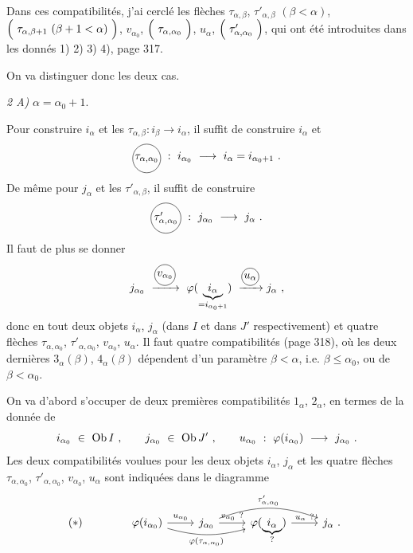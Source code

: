 Dans ces compatibilités, j'ai cerclé les flèches $\tau_{\alpha,\beta}$, $\tau'_{\alpha,\beta}$ $(\beta<\alpha)$, $\Bigl(\ \tau_{\alpha,\beta+1}\ (\beta+1<\alpha)\ \Bigr)$, $v_{\alpha_0}$, $\Bigl(\ \tau_{\alpha,\alpha_0}\ \Bigr)$, $u_\alpha$, $\Bigl(\ \tau'_{\alpha,\alpha_0}\ \Bigr)$, qui ont été introduites dans les donnés 1) 2) 3) 4), page 317. %


On va distinguer donc les deux cas.

\textit{2 A)} $\alpha=\alpha_0+1$.

Pour construire $i_\alpha$ et les $\tau_{\alpha,\beta}:i_\beta\longrightarrow i_\alpha$, il suffit de construire $i_\alpha$ et
\[
\circled{$\tau_{\alpha,\alpha_0}$}\ :\ i_{\alpha_0}\ \longrightarrow\ i_\alpha=i_{\alpha_0+1}\ .
\]
De même pour $j_\alpha$ et les $\tau'_{\alpha,\beta}$, il suffit de construire
\[
\circled{$\tau'_{\alpha,\alpha_0}$}\ :\ j_{\alpha_0}\ \longrightarrow\ j_\alpha\ .
\]
Il faut de plus se donner
\[
j_{\alpha_0}\ \xrightarrow{\circled{$v_{\alpha_0}$}}\ \varphi(\underbrace{\,i_\alpha\,}_{=i_{\alpha_0+1}})\ \xrightarrow{\circled{$u_\alpha$}} j_\alpha\ ,
\]
donc en tout deux objets $i_\alpha$, $j_\alpha$ (dans $I$ et dans $J'$ respectivement) et quatre flèches $\tau_{\alpha,\alpha_0}$, $\tau'_{\alpha,\alpha_0}$, $v_{\alpha_0}$, $u_\alpha$. Il faut quatre compatibilités (page 318), où les deux dernières $3_\alpha(\beta)$, $4_\alpha(\beta)$ dépendent d'un paramètre $\beta<\alpha$, i.e. $\beta\leqslant\alpha_0$, ou de $\beta<\alpha_0$.



On va d'abord s'occuper de deux premières compatibilités $1_\alpha$, $2_\alpha$, en termes de la donnée de
\[
i_{\alpha_0}\ \in\ \Ob I\ ,\qquad j_{\alpha_0}\ \in\ \Ob J'\ ,\qquad u_{\alpha_0}\ :\ \varphi(i_{\alpha_0})\ \longrightarrow\ j_{\alpha_0}\ .
\]
Les deux compatibilités voulues pour les deux objets $i_\alpha$, $j_\alpha$ et les quatre flèches $\tau_{\alpha,\alpha_0}$, $\tau'_{\alpha,\alpha_0}$, $v_{\alpha_0}$, $u_\alpha$ sont indiquées dans le diagramme
\[
(*)\qquad\qquad
\begin{tikzcd}
\varphi(i_{\alpha_0}) \arrow[r, "u_{\alpha_0}"] \arrow[rr, bend right=15, "\varphi(\tau_{\alpha,\alpha_0})"'] & j_{\alpha_0} \arrow[r, "v_{\alpha_0}\ ?"] \arrow[rr, bend left=20, "\tau'_{\alpha,\alpha_0}"] & \varphi(\underbrace{\,i_\alpha\,}_{?}) \arrow[r, "u_\alpha\ ?"] & j_\alpha\ .
\end{tikzcd}
\]

